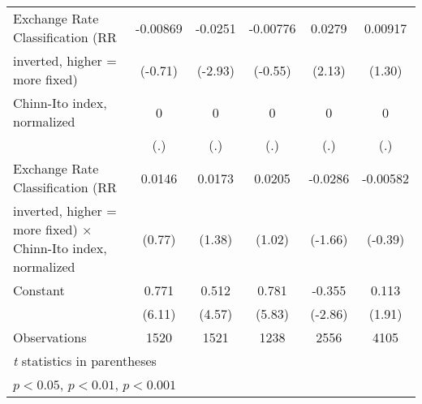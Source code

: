 \begin{table}[htbp]
\begin{tabular}{l*{5}{c}}
\addlinespace
Exchange Rate Classification (RR        & -0.00869         &  -0.0251\sym{**} & -0.00776         &   0.0279\sym{*}  &  0.00917         \\
inverted, higher = more fixed)          &  (-0.71)         &  (-2.93)         &  (-0.55)         &   (2.13)         &   (1.30)         \\
\addlinespace
Chinn-Ito index, normalized             &        0         &        0         &        0         &        0         &        0         \\
                                        &      (.)         &      (.)         &      (.)         &      (.)         &      (.)         \\
\addlinespace
Exchange Rate Classification (RR        &   0.0146         &   0.0173         &   0.0205         &  -0.0286         & -0.00582         \\
inverted, higher = more fixed) $\times$ Chinn-Ito index, normalized&   (0.77)         &   (1.38)         &   (1.02)         &  (-1.66)         &  (-0.39)         \\
\addlinespace
Constant                                &    0.771\sym{***}&    0.512\sym{***}&    0.781\sym{***}&   -0.355\sym{**} &    0.113         \\
                                        &   (6.11)         &   (4.57)         &   (5.83)         &  (-2.86)         &   (1.91)         \\
\midrule
Observations                            &     1520         &     1521         &     1238         &     2556         &     4105         \\
\bottomrule
\multicolumn{6}{l}{\footnotesize \textit{t} statistics in parentheses}\\
\multicolumn{6}{l}{\footnotesize \sym{*} \(p<0.05\), \sym{**} \(p<0.01\), \sym{***} \(p<0.001\)}\\
\end{tabular}
\end{table}
